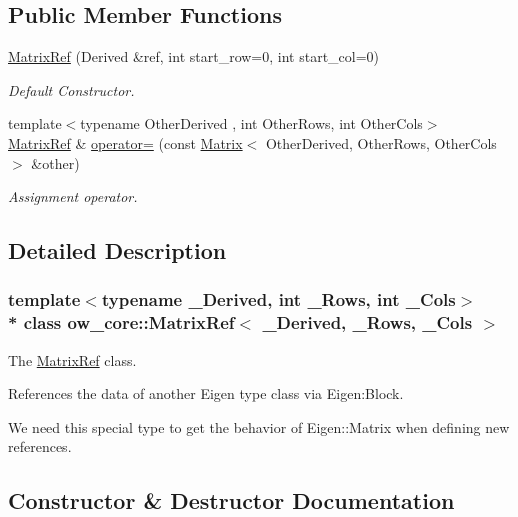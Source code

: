 \subsection*{Public Member Functions}
\begin{DoxyCompactItemize}
\item 
\hyperlink{classow__core_1_1MatrixRef_a7031e7d33a10972e9f1a085b879b6d42}{Matrix\+Ref} (Derived \&ref, int start\+\_\+row=0, int start\+\_\+col=0)
\begin{DoxyCompactList}\small\item\em Default Constructor. \end{DoxyCompactList}\item 
{\footnotesize template$<$typename Other\+Derived , int Other\+Rows, int Other\+Cols$>$ }\\\hyperlink{classow__core_1_1MatrixRef}{Matrix\+Ref} \& \hyperlink{classow__core_1_1MatrixRef_ad2a1db78f58ea5372bffcbc5e6600f2d}{operator=} (const \hyperlink{classow__core_1_1Matrix}{Matrix}$<$ Other\+Derived, Other\+Rows, Other\+Cols $>$ \&other)\hypertarget{classow__core_1_1MatrixRef_ad2a1db78f58ea5372bffcbc5e6600f2d}{}\label{classow__core_1_1MatrixRef_ad2a1db78f58ea5372bffcbc5e6600f2d}

\begin{DoxyCompactList}\small\item\em Assignment operator. \end{DoxyCompactList}\end{DoxyCompactItemize}


\subsection{Detailed Description}
\subsubsection*{template$<$typename \+\_\+\+Derived, int \+\_\+\+Rows, int \+\_\+\+Cols$>$\\*
class ow\+\_\+core\+::\+Matrix\+Ref$<$ \+\_\+\+Derived, \+\_\+\+Rows, \+\_\+\+Cols $>$}

The \hyperlink{classow__core_1_1MatrixRef}{Matrix\+Ref} class. 

References the data of another Eigen type class via Eigen\+:Block.

We need this special type to get the behavior of Eigen\+::\+Matrix when defining new references. 

\subsection{Constructor \& Destructor Documentation}
